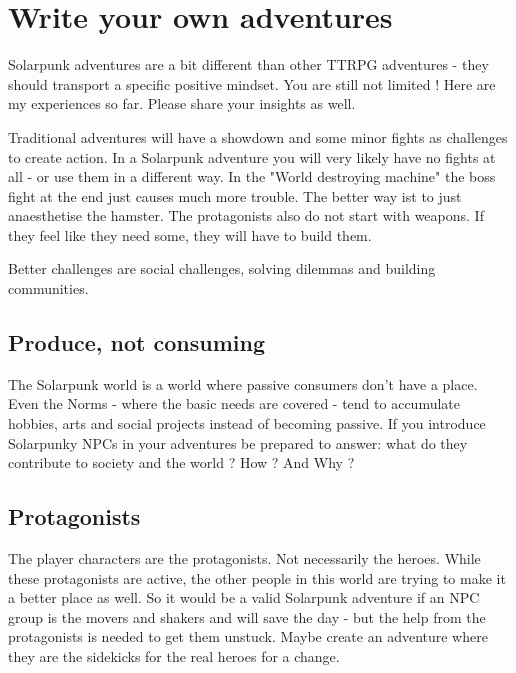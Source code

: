 

\chapter {Write your own adventures}

Solarpunk adventures are a bit different than other TTRPG adventures - they should transport a specific positive mindset. You are still not limited ! Here are my experiences so far. Please share your insights as well.

Traditional adventures will have a showdown and some minor fights as challenges to create action. In a Solarpunk adventure you will very likely have no fights at all - or use them in a different way. In the "World destroying machine" the boss fight at the end just causes much more trouble. The better way ist to just anaesthetise the hamster. The protagonists also do not start with weapons. If they feel like they need some, they will have to build them.

Better challenges are social challenges, solving dilemmas and building communities.

\section{Produce, not consuming}

The Solarpunk world is a world where passive consumers don't have a place. Even the Norms - where the basic needs are covered - tend to accumulate hobbies, arts and social projects instead of becoming passive. If you introduce Solarpunky NPCs in your adventures be prepared to answer: what do they contribute to society and the world ? How ? And Why ?

\section{Protagonists}

The player characters are the protagonists. Not necessarily the heroes. While these protagonists are active, the other people in this world are trying to make it a better place as well. So it would be a valid Solarpunk adventure if an NPC group is the movers and shakers and will save the day - but the help from the protagonists is needed to get them unstuck. Maybe create an adventure where they are the sidekicks for the real heroes for a change.

